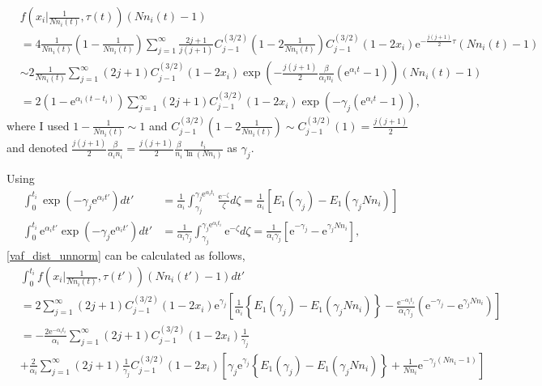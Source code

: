 \documentclass[12pt]{article}
\newcommand{\napier}{\mathrm{e}}
\begin{document}
\begin{align}
 & f\left(x_i| \frac{1}{Nn_i(t)}, \tau(t)\right) (Nn_i(t)-1)\\
 & = 4\frac{1}{Nn_i(t)}\left(1-\frac{1}{Nn_i(t)}\right) \sum_{j=1}^{\infty} \frac{2j+1}{j(j+1)} C^{(3/2)}_{j-1} \left(1-2\frac{1}{Nn_i(t)}\right) C^{(3/2)}_{j-1} (1-2x_i) \napier^{-\frac{j(j+1)}{2}\tau} \left(Nn_i(t) - 1 \right)\\
 & \sim 2\frac{1}{Nn_i(t)} \sum_{j=1}^{\infty} (2j+1) C^{(3/2)}_{j-1} (1-2x_i) \exp \left( -\frac{j(j+1)}{2} \frac{\beta}{\alpha_i n_i}\left(\napier^{\alpha_i t} - 1\right) \right) \left(Nn_i(t) - 1 \right)\\
 & = 2(1-\napier^{\alpha_i(t - t_i)}) \sum_{j=1}^{\infty} (2j+1) C^{(3/2)}_{j-1} (1-2x_i) \exp \left(-\gamma_j \left(\napier^{\alpha_i t} - 1\right)\right),
\end{align}
where I used $1 - \frac{1}{Nn_i(t)} \sim 1$ and $C^{(3/2)}_{j-1} \left(1-2\frac{1}{Nn_i(t)}\right) \sim C^{(3/2)}_{j-1} (1) = \frac{j(j+1)}{2}$ and denoted $\frac{j(j+1)}{2} \frac{\beta}{\alpha_i n_i} = \frac{j(j+1)}{2} \frac{\beta}{n_i} \frac{t_i}{\ln (Nn_i)}$ as $\gamma_j$.

Using
\begin{align}
 \int_{0}^{t_i} \exp(-\gamma_j \napier^{\alpha_i t'}) dt' & = \frac{1}{\alpha_i} \int_{\gamma_j}^{\gamma_j \napier^{\alpha_i t_i}} \frac{\napier^{-\zeta}}{\zeta} d\zeta = \frac{1}{\alpha_i} \left[ E_1(\gamma_j) - E_1(\gamma_j Nn_i) \right]\\
 \int_{0}^{t_i} \napier^{\alpha_i t'} \exp(-\gamma_j \napier^{\alpha_i t'}) dt' & = \frac{1}{\alpha_i \gamma_j} \int_{\gamma_j}^{\gamma_j \napier^{\alpha_i t_i}} \napier^{-\zeta} d\zeta = \frac{1}{\alpha_i \gamma_j} \left[ \napier^{-\gamma_j} - \napier^{\gamma_j Nn_i} \right],
\end{align}
\eqref{vaf_dist_unnorm} can be calculated as follows,
\begin{align}
 & \int_{0}^{t_i} f\left(x_i| \frac{1}{Nn_i(t)}, \tau(t')\right) (Nn_i(t')-1)  dt'\\
 & = 2 \sum_{j=1}^{\infty} (2j + 1) C^{(3/2)}_{j-1} (1-2x_i) \napier^{\gamma_j} \left[ \frac{1}{\alpha_i} \left\{ E_1(\gamma_j) - E_1(\gamma_j Nn_i) \right\} - \frac{\napier^{-\alpha_i t_i}}{\alpha_i \gamma_j} \left( \napier^{-\gamma_j} - \napier^{\gamma_j Nn_i} \right) \right]\\
 & = - \frac{2\napier^{-\alpha_i t_i}}{\alpha_i} \sum_{j=1}^{\infty} (2j+1) C^{(3/2)}_{j-1} (1-2x_i) \frac{1}{\gamma_j}\nonumber\\
 & + \frac{2}{\alpha_i} \sum_{j=1}^{\infty} (2j + 1) \frac{1}{\gamma_j} C^{(3/2)}_{j-1} (1-2x_i) \left[ \gamma_j \napier^{\gamma_j} \left\{ E_1(\gamma_j) - E_1(\gamma_j Nn_i) \right\} + \frac{1}{Nn_i} \napier^{-\gamma_j (Nn_i - 1)} \right]\label{vaf_dist_unnorm_term}
\end{align}
\end{document}
